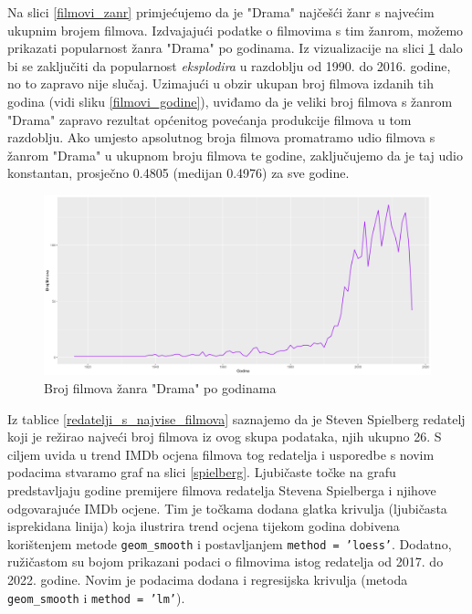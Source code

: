 	Na slici \ref{filmovi_zanr} primjećujemo da je "Drama" najčešći žanr s najvećim ukupnim brojem filmova. Izdvajajući podatke o filmovima s tim žanrom, možemo prikazati popularnost žanra "Drama" po godinama. Iz vizualizacije na slici \ref{drama} dalo bi se zaključiti da popularnost \textit{eksplodira} u razdoblju od 1990. do 2016. godine, no to zapravo nije slučaj. Uzimajući u obzir ukupan broj filmova izdanih tih godina (vidi sliku \ref{filmovi_godine}), uviđamo da je veliki broj filmova s žanrom "Drama" zapravo rezultat općenitog povećanja produkcije filmova u tom razdoblju. Ako umjesto apsolutnog broja filmova promatramo udio filmova s žanrom "Drama"  u ukupnom broju filmova te godine, zaključujemo da je taj udio konstantan, prosječno 0.4805 (medijan 0.4976) za sve godine. 
	
	\begin{figure}[H]
		\centering
		\includegraphics[width=15cm]{../figures/analysis/popularnost_drame.png}
		\caption{Broj filmova žanra "Drama" po godinama}
		\label{drama}
	\end{figure}
	
	Iz tablice \ref{redatelji_s_najvise_filmova} saznajemo da je Steven Spielberg redatelj koji je režirao najveći broj filmova iz ovog skupa podataka, njih ukupno 26. S ciljem uvida u trend IMDb ocjena filmova tog redatelja i usporedbe s novim podacima stvaramo graf na slici \ref{spielberg}. Ljubičaste točke na grafu predstavljaju godine premijere filmova redatelja Stevena Spielberga i njihove odgovarajuće IMDb ocjene. Tim je točkama dodana glatka krivulja (ljubičasta isprekidana linija) koja ilustrira trend ocjena tijekom godina dobivena korištenjem metode \texttt{geom\_smooth} i postavljanjem \texttt{method = 'loess'}. Dodatno, ružičastom su bojom prikazani podaci o  filmovima istog redatelja od 2017. do 2022. godine. Novim je podacima dodana i regresijska krivulja (metoda \texttt{geom\_smooth} i \texttt{method = 'lm'}). 
	
